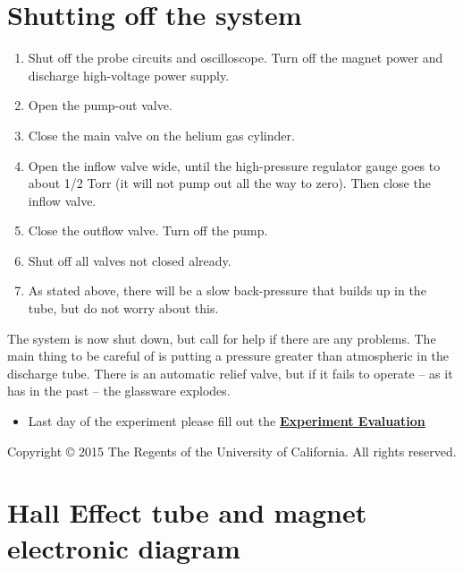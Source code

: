 \documentclass{../lab}
\begin{document}
\section{Shutting off the system}

\begin{enumerate}
    \item Shut off the probe circuits and oscilloscope. Turn off the magnet power and discharge high-voltage power supply.
    \item Open the pump-out valve.
    \item Close the main valve on the helium gas cylinder.
    \item Open the inflow valve wide, until the high-pressure regulator gauge goes to about 1/2 Torr (it will not pump out all the way to zero). Then close the inflow valve.
    \item Close the outflow valve. Turn off the pump.
    \item Shut off all valves not closed already.
    \item As stated above, there will be a slow back-pressure that builds up in the tube, but do not worry about this.
\end{enumerate}

The system is now shut down, but call for help if there are any problems. The main thing to be careful of is putting a pressure greater than atmospheric in the discharge tube. There is an automatic relief valve, but if it fails to operate -- as it has in the past -- the glassware explodes.

\begin{itemize}
    \item Last day of the experiment please fill out the \href{\ExperimentEvaluation}{\textbf{Experiment Evaluation}}
\end{itemize}

Copyright © 2015 The Regents of the University of California. All rights reserved.

\section{Hall Effect tube and magnet electronic diagram}
\end{document}
